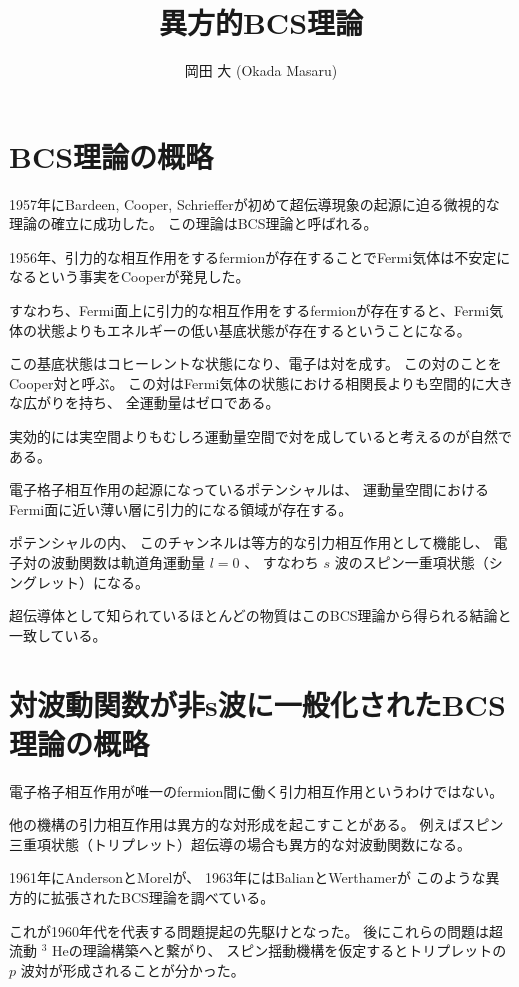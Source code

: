 \documentclass[uplatex,a4j,12pt,dvipdfmx]{jsarticle}
\title{
異方的BCS理論
}
\author{
岡田 大 (Okada Masaru)
}
\begin{document}
\maketitle

\section{BCS理論の概略}

1957年にBardeen, Cooper, Schriefferが初めて超伝導現象の起源に迫る微視的な理論の確立に成功した。
この理論はBCS理論と呼ばれる。

1956年、引力的な相互作用をするfermionが存在することでFermi気体は不安定になるという事実をCooperが発見した。

すなわち、Fermi面上に引力的な相互作用をするfermionが存在すると、Fermi気体の状態よりもエネルギーの低い基底状態が存在するということになる。

この基底状態はコヒーレントな状態になり、電子は対を成す。
この対のことをCooper対と呼ぶ。
この対はFermi気体の状態における相関長よりも空間的に大きな広がりを持ち、
全運動量はゼロである。

実効的には実空間よりもむしろ運動量空間で対を成していると考えるのが自然である。

電子格子相互作用の起源になっているポテンシャルは、
運動量空間におけるFermi面に近い薄い層に引力的になる領域が存在する。

ポテンシャルの内、
このチャンネルは等方的な引力相互作用として機能し、
電子対の波動関数は軌道角運動量 $l=0$ 、
すなわち $s$ 波のスピン一重項状態（シングレット）になる。

超伝導体として知られているほとんどの物質はこのBCS理論から得られる結論と一致している。

\section{対波動関数が非s波に一般化されたBCS理論の概略}

電子格子相互作用が唯一のfermion間に働く引力相互作用というわけではない。

他の機構の引力相互作用は異方的な対形成を起こすことがある。
例えばスピン三重項状態（トリプレット）超伝導の場合も異方的な対波動関数になる。

1961年にAndersonとMorelが、
1963年にはBalianとWerthamerが
このような異方的に拡張されたBCS理論を調べている。

これが1960年代を代表する問題提起の先駆けとなった。
後にこれらの問題は超流動 $^{3}$ Heの理論構築へと繋がり、
スピン揺動機構を仮定するとトリプレットの $p$ 波対が形成されることが分かった。
\end{document}
